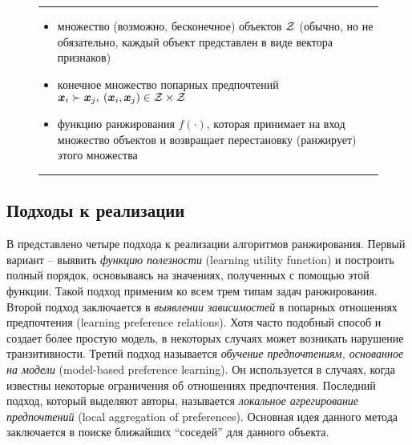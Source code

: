 	\begin{figure}[h!]
		\hrule
		\begin{description}[nosep]
			\item[Дано:] \null\leavevmode
			\begin{itemize}[itemsep=0pt,leftmargin=2ex,label=\textbf{---}]
				\item множество (возможно, бесконечное) объектов $\mathcal{Z}$ (обычно, но не обязательно, каждый объект представлен в виде вектора признаков)
				\item конечное множество попарных предпочтений $\bm{x}_i \succ \bm{x}_j, \: (\bm{x}_i, \bm{x}_j) \in \mathcal{Z} \times \mathcal{Z}$
			\end{itemize}
			\item[Найти:] \null\leavevmode
			\begin{itemize}[itemsep=0pt,leftmargin=2ex,label=\textbf{---}]
				\item функцию ранжирования $f(\cdot)$, которая принимает на вход множество объектов и возвращает перестановку (ранжирует) этого множества
			\end{itemize}
		\end{description} 
		\hrule
		\label{fig:object_ranking}
	\end{figure}
	
	\subsection{Подходы к реализации}
	В \cite{plbook:Introduction:2010} представлено четыре подхода к реализации алгоритмов ранжирования. 
	Первый вариант – выявить \emph{функцию полезности} (learning utility function) и построить полный порядок, основываясь на значениях, полученных с помощью этой функции. Такой подход применим ко всем трем типам задач ранжирования. 
	Второй подход заключается в \emph{выявлении зависимостей} в попарных отношениях предпочтения (learning preference relations). Хотя часто подобный способ и создает более простую модель, в некоторых случаях может возникать нарушение транзитивности\cite[с.~10]{plbook:Introduction:2010}. 
	Третий подход называется \emph{обучение предпочтениям, основанное на модели} (model-based preference learning). Он используется в случаях, когда известны некоторые ограничения об отношениях предпочтения. 
	Последний подход, который выделяют авторы, называется \emph{локальное агрегирование предпочтений} (local aggregation of preferences). Основная идея данного метода заключается в поиске ближайших \enquote{соседей} для данного объекта.
	
